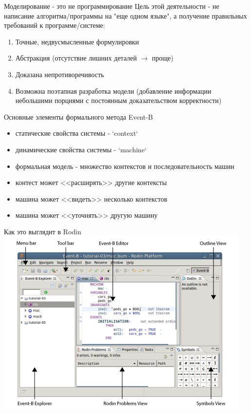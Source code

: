 \documentclass[hyperref={unicode=true}]{beamer}
\begin{document}
	\begin{frame}{Моделирование - это не программирование}
		Цель этой деятельности - не написание
		алгоритма/программы на "еще одном языке",
		а получение правильных требований к программе/системе:

		\begin{enumerate}
			\item Точные, недвусмысленные формулировки
			\item Абстракция (отсутствие лишних деталей $\rightarrow$ проще)
			\item Доказана непротиворечивость
			\item Возможна поэтапная разработка модели (добавление
			      информации небольшими порциями с постоянным
				  доказательством корректности)
		\end{enumerate}
	\end{frame}

	\begin{frame}{Основные элементы формального метода Event-B}
		\begin{itemize}
			\item статические свойства системы - `context`
			\item динамические свойства системы - `machine`
			\item формальная модель - множество контекстов и
			      последовательность машин
			\item контест может <<расширять>> другие контексты 
			\item машина может <<видеть>> несколько контекстов
			\item машина может <<уточнять>> другую машину
		\end{itemize}
	\end{frame}

	\begin{frame}[fragile]{Как это выглядит в Rodin}
		\includegraphics[scale=0.5]{rodin.png}
	\end{frame}
\end{document}
